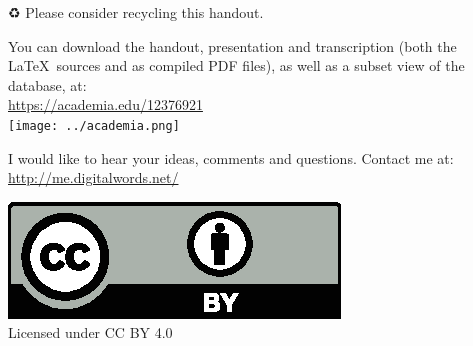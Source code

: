 \vfill


\begin{center}
\begin{extra}
	{♻} Please consider recycling this handout.

	You can download the handout, presentation and transcription (both the \LaTeX\ sources and as compiled PDF files), as well as a subset view of the database, at:\\
	\url{https://academia.edu/12376921}\\
	\texttt{[image: ../academia.png]}

	I would like to hear your ideas, comments and questions. Contact me at:\\
	\url{http://me.digitalwords.net/}

	\includegraphics[width=0.20\linewidth]{../cc-by.eps}\\
	Licensed under CC BY 4.0
\end{extra}
\end{center}
